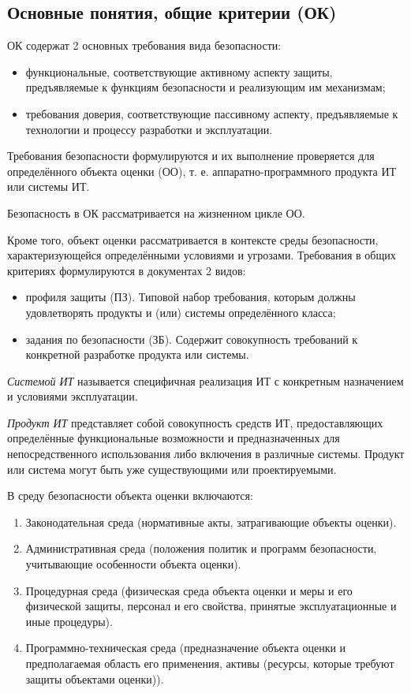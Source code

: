 \documentclass[12pt, russian, oneside, article]{ncc}
\begin{document}
\subsection{Основные понятия, общие критерии (ОК)}
\label{sec-3_1}


ОК содержат 2 основных требования вида безопасности:
\begin{itemize}
\item функциональные, соответствующие активному аспекту защиты, предъявляемые к функциям безопасности и реализующим им механизмам;
\item требования доверия, соответствующие пассивному аспекту, предъявляемые к технологии и процессу разработки и эксплуатации.
\end{itemize}

Требования безопасности формулируются и их выполнение проверяется для определённого объекта оценки (ОО), т. е. аппаратно-программного продукта ИТ или системы ИТ.

Безопасность в ОК рассматривается на жизненном цикле ОО.

Кроме того, объект оценки рассматривается в контексте среды безопасности, характеризующейся определёнными условиями и угрозами. Требования в общих критериях формулируются в документах 2 видов:
\begin{itemize}
\item профиля защиты (ПЗ). Типовой набор требования, которым должны удовлетворять продукты и (или) системы определённого класса;
\item задания по безопасности (ЗБ). Содержит совокупность требований к конкретной разработке продукта или системы.
\end{itemize}

\emph{Системой ИТ} называется специфичная реализация ИТ с конкретным назначением и условиями эксплуатации.

\emph{Продукт ИТ} представляет собой совокупность средств ИТ, предоставляющих определённые функциональные возможности и предназначенных для непосредственного использования либо включения в различные системы. Продукт или система могут быть уже существующими или проектируемыми.

В среду безопасности объекта оценки включаются:
\begin{enumerate}
\item Законодательная среда (нормативные акты, затрагивающие объекты оценки).
\item Административная среда (положения политик и программ безопасности, учитывающие особенности объекта оценки).
\item Процедурная среда (физическая среда объекта оценки и меры и его физической защиты, персонал и его свойства, принятые эксплуатационные и иные процедуры).
\item Программно-техническая среда (предназначение объекта оценки и предполагаемая область его применения, активы (ресурсы, которые требуют защиты объектами оценки)).
\end{enumerate}
\end{document}
